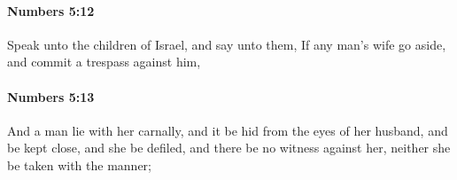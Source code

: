 		\paragraph{Numbers 5:12} %
			\label{NUMBERS-5-12}

			Speak unto the children of Israel, and say unto them, If any man’s wife go aside, and commit a trespass against him,


		\paragraph{Numbers 5:13} %
			\label{NUMBERS-5-13}

			And a man lie with her carnally, and it be hid from the eyes of her husband, and be kept close, and she be defiled, and there be no witness against her, neither she be taken with the manner;


